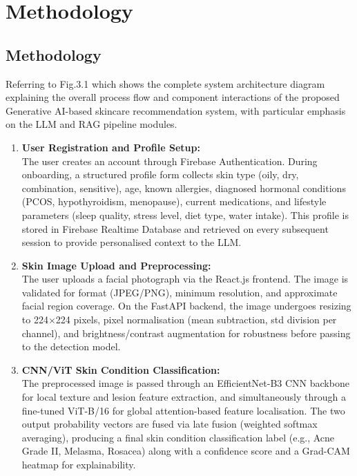 \chapter{Methodology}
\section{Methodology}

\hspace*{0.5in}Referring to Fig.3.1 which shows the complete system architecture diagram explaining the overall process flow and component interactions of the proposed Generative AI-based skincare recommendation system, with particular emphasis on the LLM and RAG pipeline modules.

\begin{enumerate}
    \item \textbf{User Registration and Profile Setup:}\\
    The user creates an account through Firebase Authentication. During onboarding, a structured profile form collects skin type (oily, dry, combination, sensitive), age, known allergies, diagnosed hormonal conditions (PCOS, hypothyroidism, menopause), current medications, and lifestyle parameters (sleep quality, stress level, diet type, water intake). This profile is stored in Firebase Realtime Database and retrieved on every subsequent session to provide personalised context to the LLM.

    \item \textbf{Skin Image Upload and Preprocessing:}\\
    The user uploads a facial photograph via the React.js frontend. The image is validated for format (JPEG/PNG), minimum resolution, and approximate facial region coverage. On the FastAPI backend, the image undergoes resizing to 224$\times$224 pixels, pixel normalisation (mean subtraction, std division per channel), and brightness/contrast augmentation for robustness before passing to the detection model.

    \item \textbf{CNN/ViT Skin Condition Classification:}\\
    The preprocessed image is passed through an EfficientNet-B3 CNN backbone for local texture and lesion feature extraction, and simultaneously through a fine-tuned ViT-B/16 for global attention-based feature localisation. The two output probability vectors are fused via late fusion (weighted softmax averaging), producing a final skin condition classification label (e.g., Acne Grade II, Melasma, Rosacea) along with a confidence score and a Grad-CAM heatmap for explainability.


\end{enumerate}
